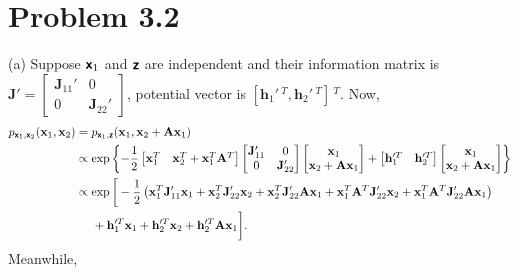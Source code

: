 \documentclass{article}
\newcommand{\bs}[1]{\textsf{\textbf{#1}}}
\newcommand{\bm}{\mathbf}
\begin{document}
\section*{Problem 3.2}
(a) Suppose $\bs{x}_1$ and $\bs{z}$ are independent and their information matrix is
$\bm{J}' =
\begin{bmatrix}
    \bm{J}_{11}' & 0 \\
    0 & \bm{J}_{22}'
\end{bmatrix}$, potential vector is $[\bm{h}_1'\,^T, \bm{h}_2'\,^T]\,^T$. Now,
\begin{align*}
p_{\bs{x}_1, \bs{x}_2}(\bm{x}_1, \bm{x}_2) &= 
p_{\bs{x}_1, \bs{z}}(\bm{x}_1, \bm{x}_2 + \bm{A}\bm{x}_1) \\
&\propto
\exp\left\{ -\frac{1}{2}
\begin{bmatrix}
    \bm{x}_1^T & \bm{x}_2^T + \bm{x}_1^T \bm{A}^T
\end{bmatrix}
\begin{bmatrix}
    \bm{J}_{11}' & 0 \\
    0 & \bm{J}_{22}'
\end{bmatrix}
\begin{bmatrix}
    \bm{x}_1 \\
    \bm{x}_2 + \bm{A}\bm{x}_1
\end{bmatrix} + 
\begin{bmatrix}
    \bm{h}_1'^T & \bm{h}_2'^T
\end{bmatrix}
\begin{bmatrix}
    \bm{x}_1 \\
    \bm{x}_2 + \bm{A}\bm{x}_1
\end{bmatrix}
\right\}\\
&\propto \exp \bigg[
-\frac{1}{2}\left(
\bm{x}_1^T\bm{J}_{11}'\bm{x}_1 +
\bm{x}_2^T\bm{J}_{22}'\bm{x}_2 +
\bm{x}_2^T\bm{J}_{22}'\bm{A}\bm{x}_1 +
\bm{x}_1^T\bm{A}^T\bm{J}_{22}'\bm{x}_2 +
\bm{x}_1^T\bm{A}^T\bm{J}_{22}'\bm{A}\bm{x}_1
\right) \\
&\;\;\;\;\;+ \bm{h}_1'^T \bm{x}_1
+ \bm{h}_2'^T \bm{x}_2
+ \bm{h}_2'^T \bm{A}\bm{x}_1 \bigg].
\end{align*}
%
Meanwhile, 
%
\end{document}
